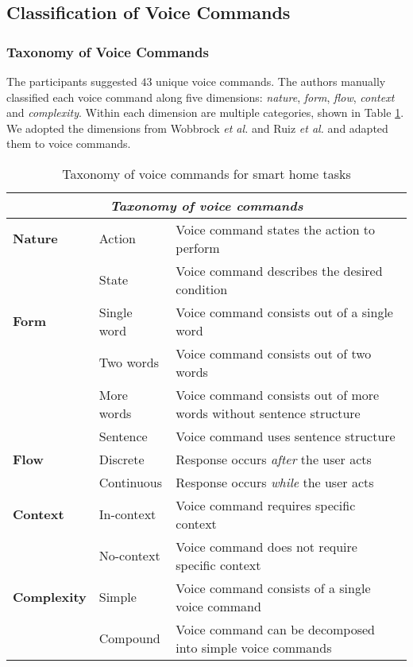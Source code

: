 \documentclass[sigchi]{acmart}
\begin{document}
\subsection{Classification of Voice Commands}
\subsubsection{Taxonomy of Voice Commands}
The participants suggested $43$ unique voice commands. The authors manually classified each voice command along five dimensions: \textit{nature}, \textit{form}, \textit{flow}, \textit{context} and \textit{complexity}. Within each dimension are multiple categories, shown in Table \ref{tab:taxVoice}. We adopted the dimensions from Wobbrock \textit{et al.} \citep{Wobbrock.2009} and Ruiz \textit{et al.} \citep{Ruiz.2011} and adapted them to voice commands. 
\begin{table}[t]
\begin{center}
\caption{Taxonomy of voice commands for smart home tasks}
\label{tab:taxVoice}
\begin{small}
\begin{tabular}{p{} p{} p{}} \toprule
\multicolumn{3}{c}{\textit{Taxonomy of voice commands}} \\ \midrule
\textbf{Nature}		& Action		& Voice command states the action to perform \\
					& State			& Voice command describes the desired condition \\ \midrule
\textbf{Form} 		& Single word	& Voice command consists out of a single word \\
					& Two words		& Voice command consists out of two words \\
					& More words	& Voice command consists out of more words without sentence structure \\
					& Sentence		& Voice command uses sentence structure \\ \midrule
\textbf{Flow}		& Discrete		& Response occurs \textit{after} the user acts \\ 
					& Continuous 	& Response occurs \textit{while} the user acts  \\ \midrule
\textbf{Context}	& In-context	& Voice command requires specific context \\
					& No-context	& Voice command does not require specific context \\ \midrule
\textbf{Complexity}	& Simple		& Voice command consists of a single voice command \\
					& Compound		& Voice command can be decomposed into simple voice commands  \\ \bottomrule
\end{tabular}
\end{small}
\end{center}
\end{table}
\end{document}
